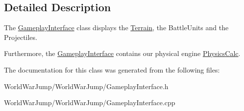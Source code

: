 \subsection{Detailed Description}
The \hyperlink{class_gameplay_interface}{Gameplay\+Interface} class displays the \hyperlink{class_terrain}{Terrain}, the Battle\+Units and the Projectiles. 

Furthermore, the \hyperlink{class_gameplay_interface}{Gameplay\+Interface} contains our physical engine \hyperlink{class_physics_calc}{Physics\+Calc}. 

The documentation for this class was generated from the following files\+:\begin{DoxyCompactItemize}
\item 
World\+War\+Jump/\+World\+War\+Jump/Gameplay\+Interface.\+h\item 
World\+War\+Jump/\+World\+War\+Jump/Gameplay\+Interface.\+cpp\end{DoxyCompactItemize}
